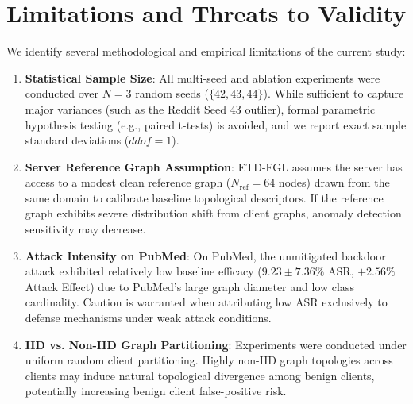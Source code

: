 \section{Limitations and Threats to Validity}
\label{sec:limitations}
We identify several methodological and empirical limitations of the current study:
\begin{enumerate}
    \item \textbf{Statistical Sample Size}: All multi-seed and ablation experiments were conducted over $N=3$ random seeds ($\{42, 43, 44\}$). While sufficient to capture major variances (such as the Reddit Seed 43 outlier), formal parametric hypothesis testing (e.g., paired t-tests) is avoided, and we report exact sample standard deviations ($ddof=1$).
    \item \textbf{Server Reference Graph Assumption}: \textsc{ETD-FGL} assumes the server has access to a modest clean reference graph ($N_{\text{ref}} = 64$ nodes) drawn from the same domain to calibrate baseline topological descriptors. If the reference graph exhibits severe distribution shift from client graphs, anomaly detection sensitivity may decrease.
    \item \textbf{Attack Intensity on PubMed}: On PubMed, the unmitigated backdoor attack exhibited relatively low baseline efficacy ($9.23 \pm 7.36\%$ ASR, $+2.56\%$ Attack Effect) due to PubMed's large graph diameter and low class cardinality. Caution is warranted when attributing low ASR exclusively to defense mechanisms under weak attack conditions.
    \item \textbf{IID vs. Non-IID Graph Partitioning}: Experiments were conducted under uniform random client partitioning. Highly non-IID graph topologies across clients may induce natural topological divergence among benign clients, potentially increasing benign client false-positive risk.
\end{enumerate}
